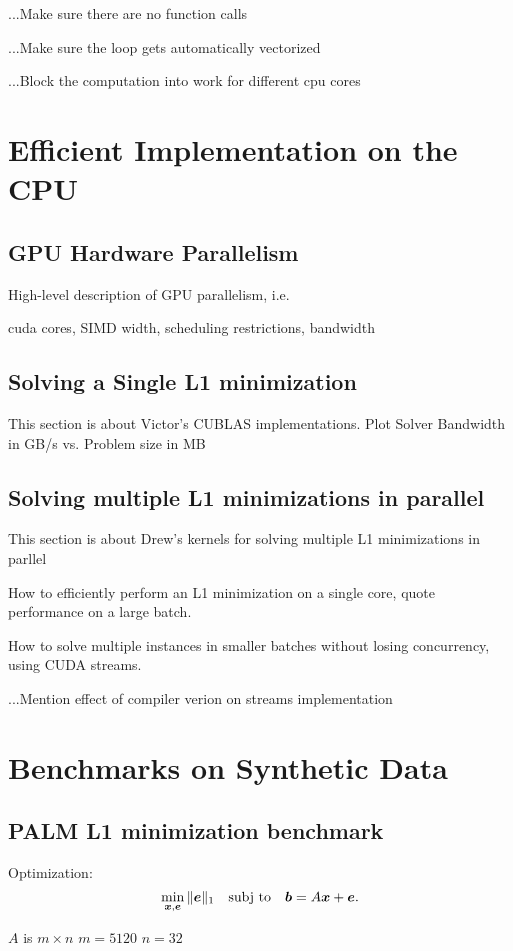 \documentclass[10pt,twocolumn,letterpaper]{article}
\begin{document}
...Make sure there are no function calls

...Make sure the loop gets automatically vectorized

...Block the computation into work for different cpu cores

\section{Efficient Implementation on the CPU}
\subsection{GPU Hardware Parallelism}
High-level description of GPU parallelism, i.e.

cuda cores, SIMD width, scheduling restrictions, bandwidth
\subsection{Solving a Single L1 minimization}
This section is about Victor's CUBLAS implementations.
Plot Solver Bandwidth in GB/s vs. Problem size in MB

\subsection{Solving multiple L1 minimizations in parallel}
This section is about Drew's kernels for solving multiple L1 minimizations in parllel

How to efficiently perform an L1 minimization on a single core, quote performance on a large batch.

How to solve multiple instances in smaller batches without losing concurrency, using CUDA streams.

...Mention effect of compiler verion on streams implementation

\section{Benchmarks on Synthetic Data}
\subsection{PALM L1 minimization benchmark}

Optimization:
\begin{equation}
\min_{{\boldsymbol{x}}, \boldsymbol{e}} \|\boldsymbol{e}\|_1 \quad \textup{subj to} \quad \boldsymbol{b} = A {\boldsymbol{x}} + \boldsymbol{e}.
\end{equation}

$A$ is $m \times n$
$m = 5120$
$n = 32$
\end{document}
